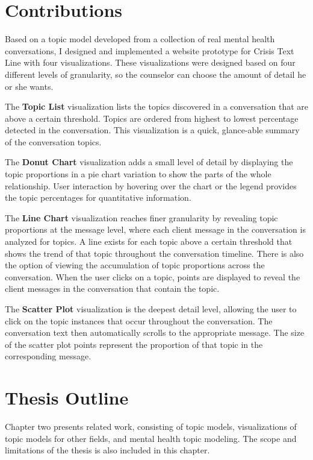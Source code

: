\section{Contributions}

Based on a topic model developed from a collection of real mental health
conversations, I designed and implemented a website prototype for Crisis Text
Line with four visualizations. These visualizations were designed based on four
different levels of granularity, so the counselor can choose the amount of detail
he or she wants.

The \textbf{Topic List} visualization lists the topics discovered in a conversation that
are above a certain threshold. Topics are ordered from highest to lowest percentage
detected in the conversation. This visualization is a quick, glance-able summary of the
conversation topics.

The \textbf{Donut Chart} visualization adds a small level of detail by displaying the
topic proportions in a pie chart variation to show the parts of the whole relationship.
User interaction by hovering over the chart or the legend provides the topic
percentages for quantitative information.

The \textbf{Line Chart} visualization reaches finer granularity by revealing topic
proportions at the message level, where each client message in the conversation
is analyzed for topics. A line exists for each topic above a certain threshold that
shows the trend of that topic throughout the conversation timeline. There is also
the option of viewing the accumulation of topic proportions across the conversation.
When the user clicks on a topic, points are displayed to reveal the client messages
in the conversation that contain the topic.

The \textbf{Scatter Plot} visualization is the deepest detail level, allowing the user to
click on the topic instances that occur throughout the conversation. The conversation
text then automatically scrolls to the appropriate message. The size of the scatter plot
points represent the proportion of that topic in the corresponding message.

\section{Thesis Outline}

Chapter two presents related work, consisting of topic models, visualizations of
topic models for other fields, and mental health topic modeling. The scope and
limitations of the thesis is also included in this chapter.


